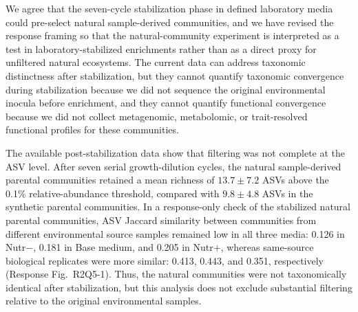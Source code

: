 

\responselabel
We agree that the seven-cycle stabilization phase in defined laboratory media could pre-select natural sample-derived communities, and we have revised the response framing so that the natural-community experiment is interpreted as a test in laboratory-stabilized enrichments rather than as a direct proxy for unfiltered natural ecosystems. The current data can address taxonomic distinctness after stabilization, but they cannot quantify taxonomic convergence during stabilization because we did not sequence the original environmental inocula before enrichment, and they cannot quantify functional convergence because we did not collect metagenomic, metabolomic, or trait-resolved functional profiles for these communities.

The available post-stabilization data show that filtering was not complete at the ASV level. After seven serial growth-dilution cycles, the natural sample-derived parental communities retained a mean richness of $13.7 \pm 7.2$ ASVs above the 0.1\% relative-abundance threshold, compared with $9.8 \pm 4.8$ ASVs in the synthetic parental communities. In a response-only check of the stabilized natural parental communities, ASV Jaccard similarity between communities from different environmental source samples remained low in all three media: 0.126 in Nutr$-$, 0.181 in Base medium, and 0.205 in Nutr$+$, whereas same-source biological replicates were more similar: 0.413, 0.443, and 0.351, respectively (Response Fig.~R2Q5-1). Thus, the natural communities were not taxonomically identical after stabilization, but this analysis does not exclude substantial filtering relative to the original environmental samples.


